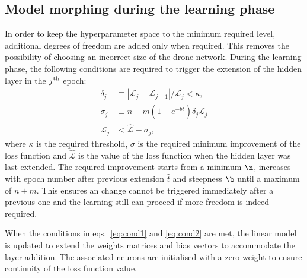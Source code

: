 \subsection{Model morphing during the learning phase}

In order to keep the hyperparameter space to the minimum required level,
additional degrees of freedom are added only when required.
This removes the possibility of choosing an incorrect size of the
drone network. During the learning phase, the following conditions are required
to trigger the extension of the hidden layer in the $j^{\rm th}$ epoch:
\begin{align}
\delta_{j} &\equiv |\mathcal{L}_j-\mathcal{L}_{j-1}|/\mathcal{L}_j < \kappa,\label{eq:cond1}\\
\sigma_{j} &\equiv n + m (1 - e^{-b\hat{t}})\delta_{j}\mathcal{L}_j \nonumber\\
\mathcal{L}_j &< \hat{\mathcal{L}} - \sigma_{j} \label{eq:cond2},
\end{align}
where $\kappa$ is the required threshold, $\sigma$ is the required minimum improvement
of the loss function and $\hat{\mathcal{L}}$ is the value of the loss function when
the hidden layer was last extended. The required improvement starts from a minimum $\n$,
increases with epoch number after previous extension $\hat{t}$ and steepness $\b$
until a maximum of $n + m$. This ensures an change cannot be triggered immediately
after a previous one and the learning still can proceed if more freedom is indeed required.

When the conditions in eqs.~\ref{eq:cond1} and \ref{eq:cond2} are met, the linear model
is updated to extend the weights matrices and bias vectors
to accommodate the layer addition.
The associated neurons are initialised with a zero weight
to ensure continuity of the loss function value.
